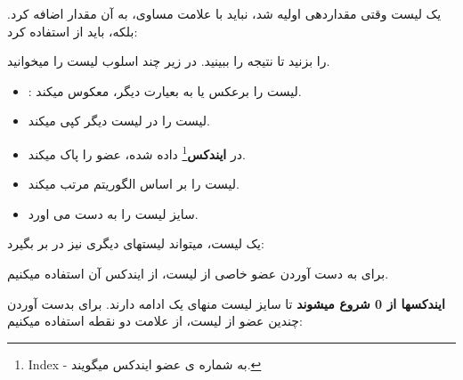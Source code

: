 \documentclass[14pt,a4paper]{memoir}
\begin{document}
	 		یک لیست وقتی مقداردهی اولیه شد، نباید با علامت مساوی، به آن مقدار اضافه کرد. بلکه، باید از  استفاده کرد:
	 	\begin{latin}
	 			
	 	\end{latin}
 		
  را بزنید تا نتیجه را ببینید.
 		در زیر چند اسلوب لیست را میخوانید.
 		\begin{itemize}
 			\item {}: لیست را برعکس یا به بعیارت دیگر، معکوس میکند.
 			\item  {} لیست را در لیست دیگر کپی میکند.
 			\item  {} در \textbf{ایندکس}\footnote{Index - به شماره ی عضو ایندکس میگویند.} داده شده، عضو را پاک میکند.
 			\item {} لیست را بر اساس الگوریتم \textbf{} مرتب میکند.
 			\item  {} سایز لیست را به دست می اورد.
 		\end{itemize}
 		
	 		
	 یک لیست، میتواند لیستهای دیگری نیز در بر بگیرد:
	 
	 
	 	\begin{latin}
	 	
	 \end{latin}
 
 برای به دست آوردن عضو خاصی از لیست، از ایندکس آن استفاده میکنیم.
 
 	 	\begin{latin}
 	
 \end{latin}
\textbf{ایندکسها از 0 شروع میشوند} تا سایز لیست منهای یک ادامه دارند. برای بدست آوردن چندین عضو از لیست، از علامت دو نقطه استفاده میکنیم:

 	 	\begin{latin}
	
\end{latin}
\end{document}
